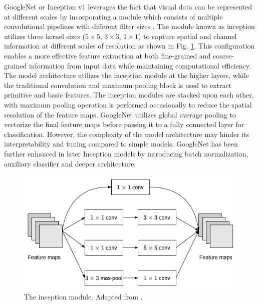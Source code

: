 \documentclass[preprint,12pt]{elsarticle}
\begin{document}
GoogleNet or Inception v1 leverages the fact that visual data can be represented at different scales by incorporating a module which consists of multiple convolutional pipelines with different filter sizes \citep{szegedy_going_2014}. The module known as inception utilizes three kernel sizes ($5 \times 5$, $3 \times 3$, $1 \times 1$) to capture spatial and channel information at different scales of resolution as shown in Fig. \ref{fig_deep_sv_learning_cnn_inception}. This configuration enables a more effective feature extraction at both fine-grained and coarse-grained information from input data while maintaining computational efficiency. The model architecture utilizes the inception module at the higher layers, while the traditional convolution and maximum pooling block is used to extract primitive and basic features. The inception modules are stacked upon each other, with maximum pooling operation is performed occasionally to reduce the spatial resolution of the feature maps. GoogleNet utilizes global average pooling to vectorize the final feature maps before passing it to a fully connected layer for classification. However, the complexity of the model architecture may hinder its interpretability and tuning compared to simple models. GoogleNet has been further enhanced in later Inception models by introducing batch normalization, auxiliary classifier and deeper architecture.

\begin{figure}[h!]
    \centering
    \includegraphics[scale=0.6]{fig_deep_sv_learning_cnn_inception.png}
    \caption{The inception module. Adapted from \citep{szegedy_going_2014}.}
    \label{fig_deep_sv_learning_cnn_inception}
\end{figure}
\end{document}

